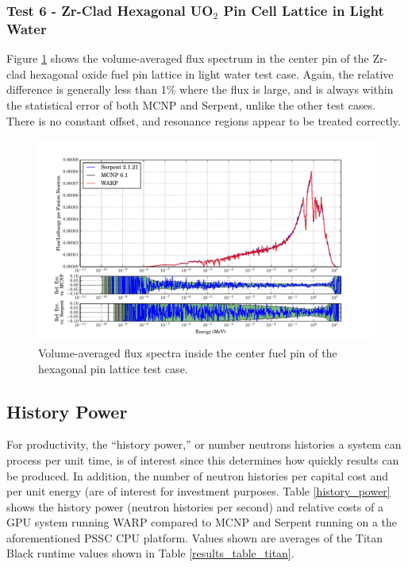\documentclass[preprint,12pt]{elsarticle}
\begin{document}
\newpage
\subsubsection{Test 6 - Zr-Clad Hexagonal UO$_2$ Pin Cell Lattice in Light Water}

Figure \ref{assembly-lw_spec} shows the volume-averaged flux spectrum in the center pin of the Zr-clad hexagonal oxide fuel pin lattice in light water test case.  Again, the relative difference is generally less than 1\% where the flux is large, and is always within the statistical error of both MCNP and Serpent, unlike the other test cases.  There is no constant offset, and resonance regions appear to be treated correctly.  

\begin{figure}[h!]
\centering
\includegraphics[width=\textwidth,trim= 1cm 0cm 1cm 0cm]{graphics/assembly-lw_spec.pdf}
\caption{Volume-averaged flux spectra inside the center fuel pin of the hexagonal pin lattice test case. \label{assembly-lw_spec} }
\end{figure}

\newpage
\subsection{History Power}

For productivity, the ``history power,'' or  number neutrons histories a system can process per unit time, is of interest since this determines how quickly results can be produced.  In addition, the number of neutron histories per capital cost and per unit energy (are of interest for investment purposes.  Table \ref{history_power} shows the history power (neutron histories per second) and relative costs of a GPU system running WARP compared to MCNP and Serpent running on a the aforementioned PSSC CPU platform.  Values shown are averages of the Titan Black runtime values shown in Table \ref{results_table_titan}.
\end{document}
